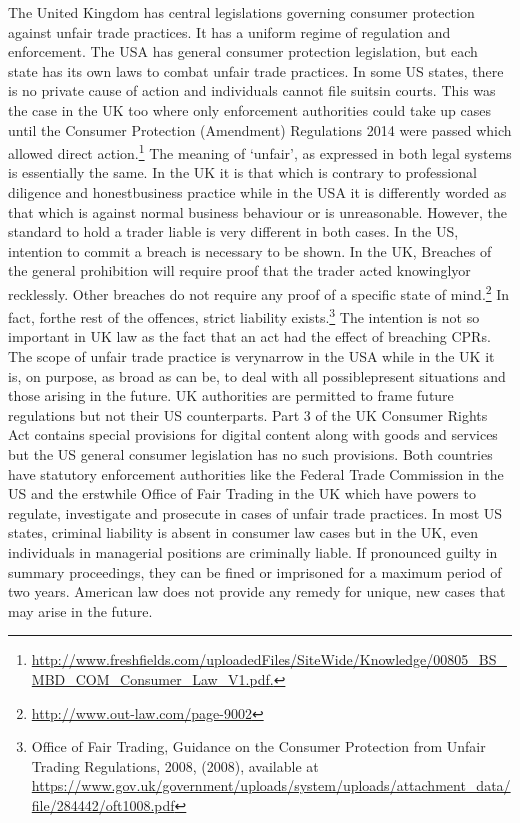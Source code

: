 \begin{multicols}{2}
\noi
The United Kingdom has central legislations governing consumer protection against unfair
trade practices. It has a uniform regime of regulation and enforcement. The USA has general
consumer protection legislation, but each state has its own laws to combat unfair trade practices.
In some US states, there is no private cause of action and individuals cannot file suitsin courts.
This was the case in the UK too where only enforcement authorities could take up cases until
the Consumer Protection (Amendment) Regulations 2014 were passed which allowed direct
action.\footnote{\url{http://www.freshfields.com/uploadedFiles/SiteWide/Knowledge/00805_BS_MBD_COM_Consumer_Law_V1.pdf.}} The meaning of ‘unfair’, as expressed in both legal systems is essentially the same. In
the UK it is that which is contrary to professional diligence and honestbusiness practice while
in the USA it is differently worded as that which is against normal business behaviour or is
unreasonable. However, the standard to hold a trader liable is very different in both cases. In
the US, intention to commit a breach is necessary to be shown. In the UK, Breaches of the
general prohibition will require proof that the trader acted knowinglyor recklessly. Other
breaches do not require any proof of a specific state of mind.\footnote{\url{http://www.out-law.com/page-9002}} In fact, forthe rest of the offences, strict liability exists.\footnote{Office of Fair Trading, Guidance on the Consumer Protection from Unfair Trading Regulations, 2008, (2008), available at\\ \url{https://www.gov.uk/government/uploads/system/uploads/attachment_data/file/284442/oft1008.pdf}} The intention is not so important in UK law as the fact that an act had the effect of breaching CPRs. The scope of unfair trade practice is verynarrow in the USA while in the UK it is, on purpose, as broad as can be, to deal with all possiblepresent situations and those arising in the future. UK authorities are permitted to frame future regulations but not their US counterparts. Part 3 of the UK Consumer Rights Act contains special provisions for digital content along with goods and services but the US general consumer legislation has no such provisions. Both countries have statutory enforcement authorities like the Federal Trade Commission in the US and the erstwhile Office of Fair Trading in the UK which have powers to regulate, investigate and prosecute in cases of unfair trade practices. In most US states, criminal liability is absent in consumer law cases but in the UK, even individuals in managerial positions are criminally liable. If pronounced guilty in summary proceedings, they can be fined or imprisoned for a maximum period of two years. American law does not provide any remedy for unique, new cases that may arise in the future.


\end{multicols}
